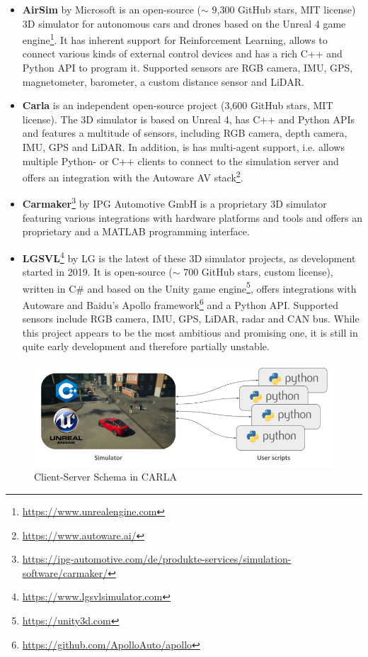 \begin{itemize}
	\item \textbf{AirSim} by Microsoft \cite{airsim2017fsr} is an open-source ($\sim$ 9,300 GitHub stars, MIT license) 3D simulator for autonomous cars and drones based on the Unreal 4 game engine\footnote{\url{https://www.unrealengine.com}}. It has inherent support for Reinforcement Learning, allows to connect various kinds of external control devices and has a rich C++ and Python API to program it. Supported sensors are RGB camera, IMU, GPS, magnetometer, barometer, a custom distance sensor and LiDAR. 
	\item \textbf{Carla} \cite{Dosovitskiy17} is an independent open-source project (3,600 GitHub stars, MIT license). The 3D simulator is based on Unreal 4, has C++ and Python APIs and features a multitude of sensors, including RGB camera, depth camera, IMU, GPS and LiDAR. In addition, is has multi-agent support, i.e. allows multiple Python- or C++ clients to connect to the simulation server and offers an integration with the Autoware AV stack\footnote{\url{https://www.autoware.ai/}}.
	\item \textbf{Carmaker}\footnote{\url{https://ipg-automotive.com/de/produkte-services/simulation-software/carmaker/}} by IPG Automotive GmbH is a proprietary 3D simulator featuring various integrations with hardware platforms and tools and offers an proprietary and a MATLAB programming interface.
	\item \textbf{LGSVL}\footnote{\url{https://www.lgsvlsimulator.com}} by LG is the latest of these 3D simulator projects, as development started in 2019. It is open-source ($\sim$ 700 GitHub stars, custom license), written in C\# and based on the Unity game engine\footnote{\url{https://unity3d.com}}, offers integrations with Autoware and Baidu's Apollo framework\footnote{\url{https://github.com/ApolloAuto/apollo}} and a Python API. Supported sensors include RGB camera, IMU, GPS, LiDAR, radar and CAN bus. While this project appears to be the most ambitious and promising one, it is still in quite early development and therefore partially unstable.
\end{itemize}

\begin{figure}
	\centering
	\includegraphics[width=0.8\linewidth]{98_images/carla_modules}
	\caption{Client-Server Schema in CARLA \cite{CarlaContributors}}
	\label{fig:carla_modules}
\end{figure}

